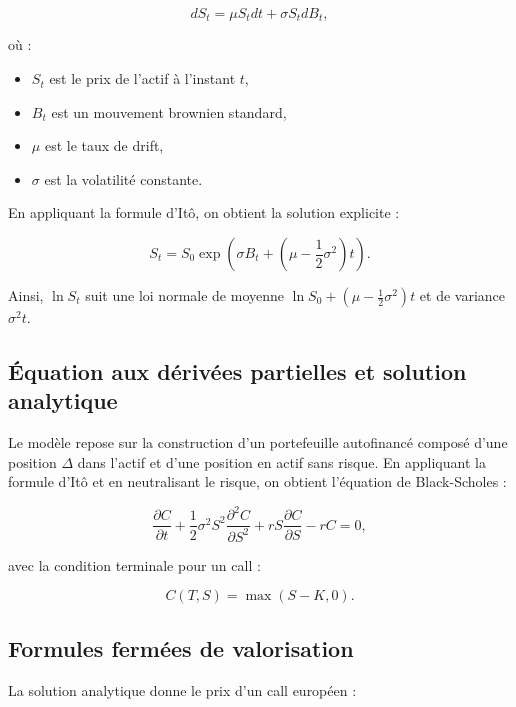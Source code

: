 \begin{equation}
	dS_t = \mu S_t dt + \sigma S_t dB_t,
\end{equation}

où :
\begin{itemize}
	\item $S_t$ est le prix de l'actif à l'instant $t$,
	\item $B_t$ est un mouvement brownien standard,
	\item $\mu$ est le taux de drift,
	\item $\sigma$ est la volatilité constante.
\end{itemize}

En appliquant la formule d'Itô, on obtient la solution explicite :

\begin{equation}
	S_t = S_0 \exp\left( \sigma B_t + \left( \mu - \frac{1}{2} \sigma^2 \right) t \right).
\end{equation}

Ainsi, $\ln S_t$ suit une loi normale de moyenne $\ln S_0 + \left( \mu - \frac{1}{2}\sigma^2 \right)t$ et de variance $\sigma^2 t$.

\subsection{Équation aux dérivées partielles et solution analytique}

Le modèle repose sur la construction d'un portefeuille autofinancé composé d'une position $\Delta$ dans l'actif et d'une position en actif sans risque. En appliquant la formule d'Itô et en neutralisant le risque, on obtient l'équation de Black-Scholes :

\begin{equation}
	\frac{\partial C}{\partial t} + \frac{1}{2}\sigma^2 S^2 \frac{\partial^2 C}{\partial S^2} + rS \frac{\partial C}{\partial S} - rC = 0,
\end{equation}

avec la condition terminale pour un call :

\begin{equation}
	C(T,S) = \max(S-K,0).
\end{equation}

\subsection{Formules fermées de valorisation}

La solution analytique donne le prix d'un call européen :

